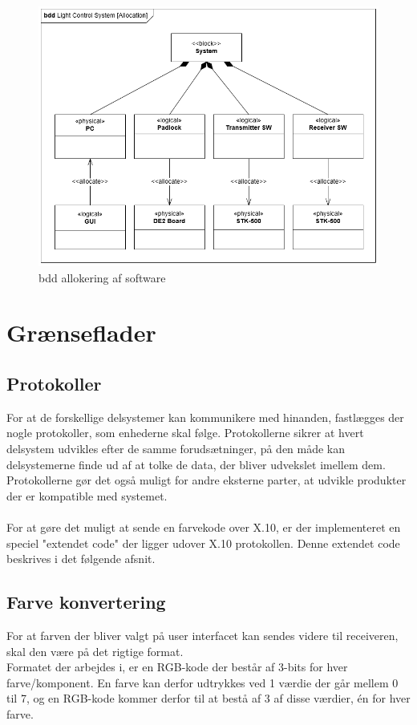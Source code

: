 \documentclass[oneside]{memoir}
\begin{document}
		\begin{figure}[H]
\centering
\includegraphics[width=1\linewidth]{"billeder til latex/allokering"}
\caption{bdd allokering af software}
\label{fig:allokering}
\end{figure}
\newpage
\section{Grænseflader}


\subsection{Protokoller}
For at de forskellige delsystemer kan kommunikere med hinanden, fastlægges der nogle protokoller, som enhederne skal følge. Protokollerne sikrer at hvert delsystem udvikles efter de samme forudsætninger, på den måde kan delsystemerne finde ud af at tolke de data, der bliver udvekslet imellem dem. Protokollerne gør det også muligt for andre eksterne parter, at udvikle produkter der er kompatible med systemet.  \\
\\
For at gøre det muligt at sende en farvekode over X.10, er der implementeret en speciel "extendet code" der ligger udover X.10 protokollen. Denne extendet code beskrives i det følgende afsnit. \\
\subsection{Farve konvertering}
For at farven der bliver valgt på user interfacet kan sendes videre til receiveren, skal den være på det rigtige format. \\
Formatet der arbejdes i, er en RGB-kode der består af 3-bits for hver farve/komponent. En farve kan derfor udtrykkes ved 1 værdie der går mellem 0 til 7, og en RGB-kode kommer derfor til at bestå af 3 af disse værdier, én for hver farve.\\
\end{document}
